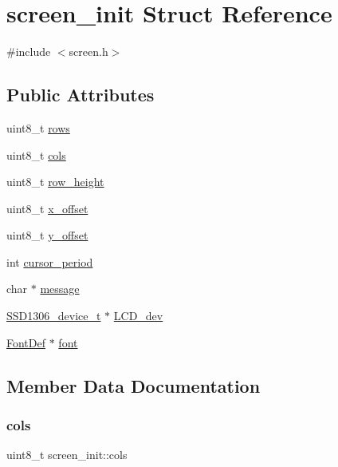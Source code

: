 \hypertarget{structscreen__init}{}\section{screen\+\_\+init Struct Reference}
\label{structscreen__init}


{\ttfamily \#include $<$screen.\+h$>$}

\subsection*{Public Attributes}
\begin{DoxyCompactItemize}
\item 
uint8\+\_\+t \hyperlink{structscreen__init_a9d91f1f08461c2137dfeca5f443ba809}{rows}
\item 
uint8\+\_\+t \hyperlink{structscreen__init_a5fe63336ef17a8d163cb312748213ae3}{cols}
\item 
uint8\+\_\+t \hyperlink{structscreen__init_a3c5044fdb24cb4bbf1526b039444d30f}{row\+\_\+height}
\item 
uint8\+\_\+t \hyperlink{structscreen__init_a2fdbfee48fc2d925b08ced850ee5771d}{x\+\_\+offset}
\item 
uint8\+\_\+t \hyperlink{structscreen__init_a12f08370536e8e5dfe7fdaa0f47817e7}{y\+\_\+offset}
\item 
int \hyperlink{structscreen__init_aa7d90b2284c9759b47465228703f651b}{cursor\+\_\+period}
\item 
char $\ast$ \hyperlink{structscreen__init_a18d6e9f7b76f4ffaaf2385b620e3e64e}{message}
\item 
\hyperlink{datatypes_8h_afa3700e77990b75b3fcc954070aa90fe}{S\+S\+D1306\+\_\+device\+\_\+t} $\ast$ \hyperlink{structscreen__init_a4f54c32275f8b358a9622500b9aa487d}{L\+C\+D\+\_\+dev}
\item 
\hyperlink{structFontDef}{Font\+Def} $\ast$ \hyperlink{structscreen__init_a04580286aaefd88685e7d7e4f88b7423}{font}
\end{DoxyCompactItemize}


\subsection{Member Data Documentation}
\mbox{\label{structscreen__init_a5fe63336ef17a8d163cb312748213ae3}} 
\subsubsection{\texorpdfstring{cols}{cols}}
{\footnotesize\ttfamily uint8\+\_\+t screen\+\_\+init\+::cols}

